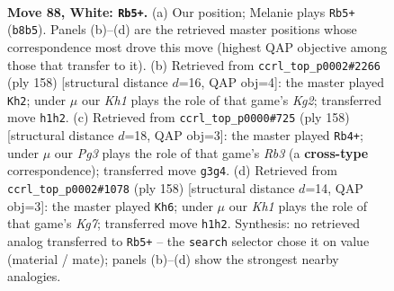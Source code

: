 \documentclass[11pt]{article}
\begin{document}
\clearpage

\begin{figure}[p]\centering
\begin{subfigure}{0.46\textwidth}\centering
\resizebox{\linewidth}{!}{%
\newchessgame
\chessboard[
  setfen={1R6/3r2p1/5p2/3k3p/7P/6P1/2N5/7K w - - 0 88},
  showmover=false,
  pgfstyle=straightmove, color=movearrow, markmove={b8-b5}
]}
\caption{}
\end{subfigure}\hfill
\begin{subfigure}{0.46\textwidth}\centering
\resizebox{\linewidth}{!}{%
\newchessgame
\chessboard[
  setfen={5r1k/2R5/6p1/7p/7P/6P1/6K1/8 w - - 46 80},
  showmover=false,
  pgfstyle=straightmove, color=movearrow, markmove={g2-h2}
]}
\caption{}
\end{subfigure}
\\[4pt]
\begin{subfigure}{0.46\textwidth}\centering
\resizebox{\linewidth}{!}{%
\newchessgame
\chessboard[
  setfen={8/8/8/6p1/4k1Pp/1R5P/4r3/6K1 w - - 0 80},
  showmover=false,
  pgfstyle=straightmove, color=movearrow, markmove={b3-b4}
]}
\caption{}
\end{subfigure}\hfill
\begin{subfigure}{0.46\textwidth}\centering
\resizebox{\linewidth}{!}{%
\newchessgame
\chessboard[
  setfen={8/1k4K1/8/1r5p/6pP/2R3P1/8/8 w - - 6 80},
  showmover=false,
  pgfstyle=straightmove, color=movearrow, markmove={g7-h6}
]}
\caption{}
\end{subfigure}
\caption{\textbf{Move 88, White: \texttt{Rb5+}.} (a) Our position; Melanie plays \texttt{Rb5+} (\texttt{b8b5}). Panels (b)--(d) are the retrieved master positions whose correspondence most drove this move (highest QAP objective among those that transfer to it). (b) Retrieved from \texttt{ccrl\_top\_p0002\#2266} (ply 158) [structural distance $d$=16, QAP obj=4]: the master played \texttt{Kh2}; under $\mu$ our \emph{Kh1} plays the role of that game's \emph{Kg2}; transferred move \texttt{h1h2}. (c) Retrieved from \texttt{ccrl\_top\_p0000\#725} (ply 158) [structural distance $d$=18, QAP obj=3]: the master played \texttt{Rb4+}; under $\mu$ our \emph{Pg3} plays the role of that game's \emph{Rb3} (a \textbf{cross-type} correspondence); transferred move \texttt{g3g4}. (d) Retrieved from \texttt{ccrl\_top\_p0002\#1078} (ply 158) [structural distance $d$=14, QAP obj=3]: the master played \texttt{Kh6}; under $\mu$ our \emph{Kh1} plays the role of that game's \emph{Kg7}; transferred move \texttt{h1h2}. Synthesis: no retrieved analog transferred to \texttt{Rb5+} -- the \texttt{search} selector chose it on value (material / mate); panels (b)--(d) show the strongest nearby analogies.}
\label{fig:thought-m174}
\end{figure}
\end{document}
